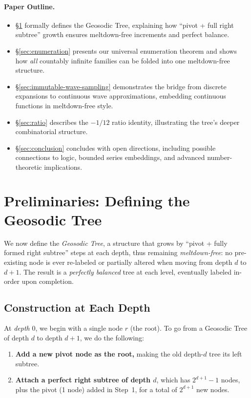 \documentclass[acmsmall]{acmart}
\theoremstyle{definition}
\theoremstyle{remark}
\begin{document}
\paragraph{Paper Outline.}
\begin{itemize}
  \item \S\ref{sec:prelim} formally defines the Geosodic Tree, explaining how “pivot + full 
        right subtree” growth ensures meltdown-free increments and perfect balance.
  \item \S\ref{sec:enumeration} presents our universal enumeration theorem and shows how 
        \emph{all} countably infinite families can be folded into one meltdown-free structure.
  \item \S\ref{sec:immutable-wave-sampling} demonstrates the bridge from discrete expansions 
        to continuous wave approximations, embedding continuous functions in meltdown-free style.
  \item \S\ref{sec:ratio} describes the $-1/12$ ratio identity, illustrating the tree’s 
        deeper combinatorial structure.
  \item \S\ref{sec:conclusion} concludes with open directions, including possible connections 
        to logic, bounded series embeddings, and advanced number-theoretic implications.
\end{itemize}
 \section{Preliminaries: Defining the Geosodic Tree}
\label{sec:prelim}

We now define the \emph{Geosodic Tree}, a structure that grows by 
``pivot + fully formed right subtree'' steps at each depth, 
thus remaining \emph{meltdown-free}: 
no pre-existing node is ever re-labeled or partially altered when moving 
from depth $d$ to $d+1$. The result is a \emph{perfectly balanced} tree 
at each level, eventually labeled in-order upon completion.

\subsection{Construction at Each Depth}
\label{subsec:construction}

At \emph{depth} $0$, we begin with a single node $r$ (the root). To go from a Geosodic Tree
of depth $d$ to depth $d+1$, we do the following:

\begin{enumerate}
  \item \textbf{Add a new pivot node as the root,} making the old depth-$d$ tree its left subtree.
  \item \textbf{Attach a perfect right subtree of depth $d$}, which has $2^{d+1}-1$ nodes,
        plus the pivot (1 node) added in Step~1, for a total of $2^{d+1}$ new nodes.
\end{enumerate}
\end{document}
